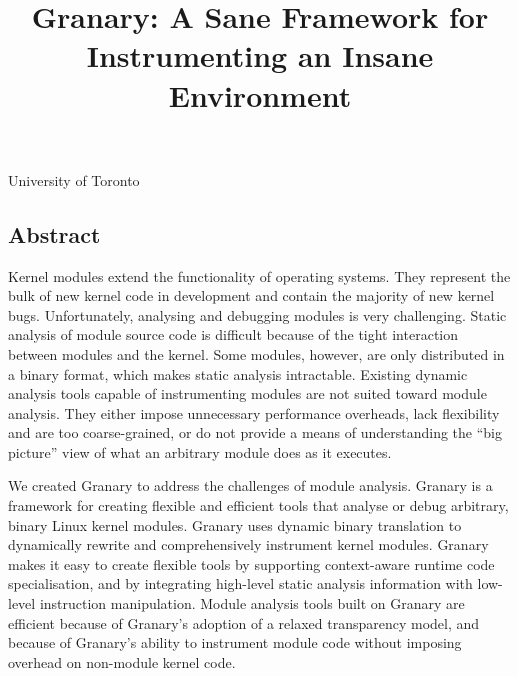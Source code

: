 \documentclass[preprint]{sigplanconf}
\begin{document}

\title{Granary: A Sane Framework for Instrumenting an Insane Environment}

{University of Toronto}{}

\maketitle
\subsection*{Abstract}
Kernel modules extend the functionality of operating systems. They represent the bulk of new kernel code in development and contain the majority of new kernel bugs. Unfortunately, analysing and debugging modules is very challenging. Static analysis of module source code is difficult because of the tight interaction between modules and the kernel. Some modules, however, are only distributed in a binary format, which makes static analysis intractable. Existing dynamic analysis tools capable of instrumenting modules are not suited toward module analysis. They either impose unnecessary performance overheads, lack flexibility and are too coarse-grained, or do not provide a means of understanding the ``big picture'' view of what an arbitrary module does as it executes.

We created Granary to address the challenges of module analysis. Granary is a framework for creating flexible and efficient tools that analyse or debug arbitrary, binary Linux kernel modules. Granary uses dynamic binary translation to dynamically rewrite and comprehensively instrument kernel modules. Granary makes it easy to create flexible tools by supporting context-aware runtime code specialisation, and by integrating high-level static analysis information with low-level instruction manipulation. Module analysis tools built on Granary are efficient because of Granary's adoption of a relaxed transparency model, and because of Granary's ability to instrument module code without imposing overhead on non-module kernel code.

\end{document}
